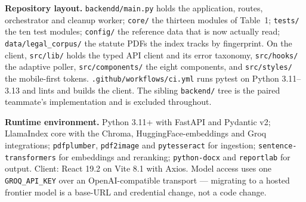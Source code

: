 \documentclass[11pt,a4paper]{article}
\newcommand{\code}[1]{\texttt{\small #1}}
\begin{document}
\begin{quietbox}
\footnotesize
\textbf{Repository layout.} \code{backendd/main.py} holds the application, routes,
orchestrator and cleanup worker; \code{core/} the thirteen modules of Table~1;
\code{tests/} the ten test modules; \code{config/} the reference data that is now actually
read; \code{data/legal\_corpus/} the statute PDFs the index tracks by fingerprint. On the
client, \code{src/lib/} holds the typed API client and its error taxonomy,
\code{src/hooks/} the adaptive poller, \code{src/components/} the eight components, and
\code{src/styles/} the mobile-first tokens. \code{.github/workflows/ci.yml} runs pytest on
Python 3.11--3.13 and lints and builds the client. The sibling \code{backend/} tree is the
paired teammate's implementation and is excluded throughout.

\smallskip
\textbf{Runtime environment.} Python 3.11+ with FastAPI and Pydantic v2; LlamaIndex core with
the Chroma, HuggingFace-embeddings and Groq integrations; \code{pdfplumber},
\code{pdf2image} and \code{pytesseract} for ingestion; \code{sentence-transformers} for
embeddings and reranking; \code{python-docx} and \code{reportlab} for output. Client: React
19.2 on Vite 8.1 with Axios. Model access uses one \code{GROQ\_API\_KEY} over an
OpenAI-compatible transport --- migrating to a hosted frontier model is a base-URL and
credential change, not a code change.
\end{quietbox}
\end{document}
